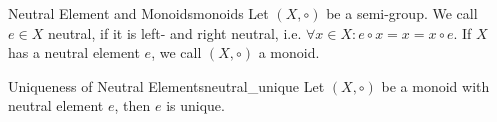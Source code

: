 \begin{definition}{Neutral Element and Monoids}{monoids}
    Let $(X,\circ)$ be a semi-group. We call $e\in X$ neutral, if it is left- and right neutral, i.e.
    $\forall x\in X\colon e\circ x = x = x\circ e$. If $X$ has a neutral element $e$, we call 
    $(X,\circ)$ a monoid.
\end{definition}

\begin{theorem}{Uniqueness of Neutral Elements}{neutral_unique}
    Let $(X,\circ)$ be a monoid with neutral element $e$, then $e$ is unique.
\end{theorem}